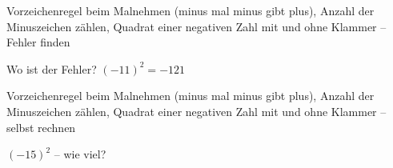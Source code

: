 \begin{aufgabe}{Vorzeichenregel beim Malnehmen (minus mal minus gibt plus), Anzahl der Minuszeichen zählen, Quadrat einer negativen Zahl mit und ohne Klammer – Fehler finden}
\begin{teile}
\teil Wo ist der Fehler? $(-11)^2 = -121$
\end{teile}
\end{aufgabe}

\begin{aufgabe}{Vorzeichenregel beim Malnehmen (minus mal minus gibt plus), Anzahl der Minuszeichen zählen, Quadrat einer negativen Zahl mit und ohne Klammer – selbst rechnen}
\begin{teile}
\teil $(-15)^2$ – wie viel? \leerfeld
\end{teile}
\end{aufgabe}
